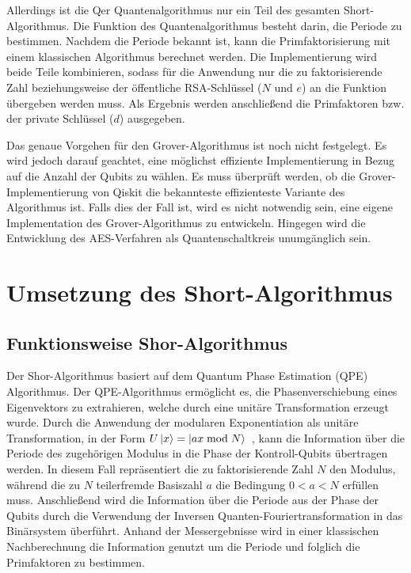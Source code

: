 \documentclass[a4paper,journal]{IEEEtran}
\begin{document}
Allerdings ist die Qer Quantenalgorithmus nur ein Teil des gesamten Short-Algorithmus.
Die Funktion des Quantenalgorithmus besteht darin,
die Periode zu bestimmen.
Nachdem die Periode bekannt ist,
kann die Primfaktorisierung mit einem klassischen Algorithmus berechnet werden.
Die Implementierung wird beide Teile kombinieren,
sodass für die Anwendung nur die zu faktorisierende Zahl beziehungsweise
der öffentliche RSA-Schlüssel (\(N\) und \(e\)) an die Funktion übergeben werden muss.
Als Ergebnis werden anschließend die Primfaktoren bzw. der private Schlüssel (\(d\)) ausgegeben.

Das genaue Vorgehen für den Grover-Algorithmus ist noch nicht festgelegt.
Es wird jedoch darauf geachtet, eine möglichst effiziente Implementierung in Bezug auf die Anzahl der Qubits zu wählen.
Es muss überprüft werden, ob die Grover-Implementierung von Qiskit die bekannteste effizienteste Variante des Algorithmus ist.
Falls dies der Fall ist, wird es nicht notwendig sein,
eine eigene Implementation des Grover-Algorithmus zu entwickeln.
Hingegen wird die Entwicklung des AES-Verfahren als Quantenschaltkreis unumgänglich sein.

\section{Umsetzung des Short-Algorithmus}
\subsection{Funktionsweise Shor-Algorithmus}

Der Shor-Algorithmus basiert auf dem Quantum Phase Estimation (QPE) Algorithmus.
Der QPE-Algorithmus ermöglicht es, die Phasenverschiebung eines Eigenvektors zu extrahieren,
welche durch eine unitäre Transformation erzeugt wurde.
Durch die Anwendung der modularen Exponentiation als unitäre Transformation,
in der Form \(U\ket{x} = \ket{ax \bmod N}\)~\cite{IBM:Shor},
kann die Information über die Periode des zugehörigen Modulus in die Phase der Kontroll-Qubits übertragen werden.
In diesem Fall repräsentiert die zu faktorisierende Zahl \(N\) den Modulus,
während die zu \(N\) teilerfremde Basiszahl \(a\) die Bedingung \(0 < a < N\) erfüllen muss.
Anschließend wird die Information über die Periode aus der Phase der Qubits
durch die Verwendung der Inversen Quanten-Fouriertransformation in das Binärsystem überführt.
Anhand der Messergebnisse wird in einer klassischen Nachberechnung die Information genutzt
um die Periode und folglich die Primfaktoren zu bestimmen.
\end{document}
